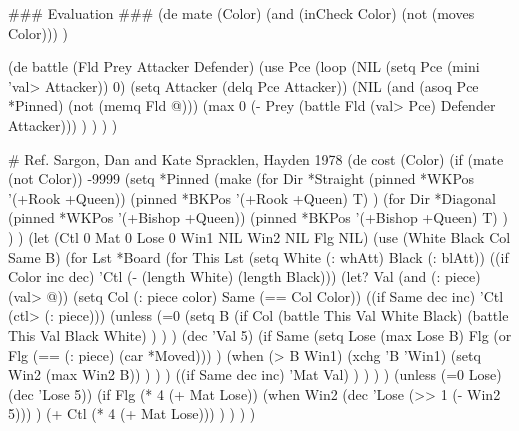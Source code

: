 \begin{wideverbatim}

 
### Evaluation ###
(de mate (Color)
   (and (inCheck Color) (not (moves Color))) )
 
(de battle (Fld Prey Attacker Defender)
   (use Pce
      (loop
         (NIL (setq Pce (mini 'val> Attacker)) 0)
         (setq Attacker (delq Pce Attacker))
         (NIL (and (asoq Pce *Pinned) (not (memq Fld @)))
            (max 0 (- Prey (battle Fld (val> Pce) Defender Attacker))) ) ) ) )
 
# Ref. Sargon, Dan and Kate Spracklen, Hayden 1978
(de cost (Color)
   (if (mate (not Color))
      -9999
      (setq *Pinned
         (make
            (for Dir *Straight
               (pinned *WKPos '(+Rook +Queen))
               (pinned *BKPos '(+Rook +Queen) T) )
            (for Dir *Diagonal
               (pinned *WKPos '(+Bishop +Queen))
               (pinned *BKPos '(+Bishop +Queen) T) ) ) )
      (let (Ctl 0  Mat 0  Lose 0  Win1 NIL  Win2 NIL  Flg NIL)
         (use (White Black Col Same B)
            (for Lst *Board
               (for This Lst
                  (setq White (: whAtt)  Black (: blAtt))
                  ((if Color inc dec) 'Ctl (- (length White) (length Black)))
                  (let? Val (and (: piece) (val> @))
                     (setq Col (: piece color)  Same (== Col Color))
                     ((if Same dec inc) 'Ctl (ctl> (: piece)))
                     (unless
                        (=0
                           (setq B
                              (if Col
                                 (battle This Val White Black)
                                 (battle This Val Black White) ) ) )
                        (dec 'Val 5)
                        (if Same
                           (setq
                              Lose (max Lose B)
                              Flg (or Flg (== (: piece) (car *Moved))) )
                           (when (> B Win1)
                              (xchg 'B 'Win1)
                              (setq Win2 (max Win2 B)) ) ) )
                     ((if Same dec inc) 'Mat Val) ) ) ) )
         (unless (=0 Lose) (dec 'Lose 5))
         (if Flg
            (* 4 (+ Mat Lose))
            (when Win2
               (dec 'Lose (>> 1 (- Win2 5))) )
            (+ Ctl (* 4 (+ Mat Lose))) ) ) ) )

\end{wideverbatim}

